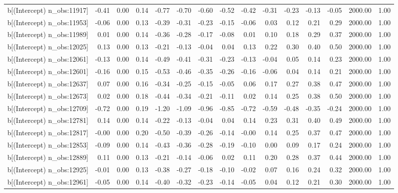 \begin{table}[ht]
\begin{tabular}{rrrrrrrrrrrrrrr}
  b[(Intercept) n\_obs:11917] & -0.41 & 0.00 & 0.14 & -0.77 & -0.70 & -0.60 & -0.52 & -0.42 & -0.31 & -0.23 & -0.13 & -0.05 & 2000.00 & 1.00 \\ 
  b[(Intercept) n\_obs:11953] & -0.06 & 0.00 & 0.13 & -0.39 & -0.31 & -0.23 & -0.15 & -0.06 & 0.03 & 0.12 & 0.21 & 0.29 & 2000.00 & 1.00 \\ 
  b[(Intercept) n\_obs:11989] & 0.01 & 0.00 & 0.14 & -0.36 & -0.28 & -0.17 & -0.08 & 0.01 & 0.10 & 0.18 & 0.29 & 0.37 & 2000.00 & 1.00 \\ 
  b[(Intercept) n\_obs:12025] & 0.13 & 0.00 & 0.13 & -0.21 & -0.13 & -0.04 & 0.04 & 0.13 & 0.22 & 0.30 & 0.40 & 0.50 & 2000.00 & 1.00 \\ 
  b[(Intercept) n\_obs:12061] & -0.13 & 0.00 & 0.14 & -0.49 & -0.41 & -0.31 & -0.23 & -0.13 & -0.04 & 0.05 & 0.14 & 0.23 & 2000.00 & 1.00 \\ 
  b[(Intercept) n\_obs:12601] & -0.16 & 0.00 & 0.15 & -0.53 & -0.46 & -0.35 & -0.26 & -0.16 & -0.06 & 0.04 & 0.14 & 0.21 & 2000.00 & 1.00 \\ 
  b[(Intercept) n\_obs:12637] & 0.07 & 0.00 & 0.16 & -0.34 & -0.25 & -0.15 & -0.05 & 0.06 & 0.17 & 0.27 & 0.38 & 0.47 & 2000.00 & 1.00 \\ 
  b[(Intercept) n\_obs:12673] & 0.02 & 0.00 & 0.18 & -0.44 & -0.34 & -0.21 & -0.11 & 0.02 & 0.14 & 0.25 & 0.38 & 0.50 & 2000.00 & 1.00 \\ 
  b[(Intercept) n\_obs:12709] & -0.72 & 0.00 & 0.19 & -1.20 & -1.09 & -0.96 & -0.85 & -0.72 & -0.59 & -0.48 & -0.35 & -0.24 & 2000.00 & 1.00 \\ 
  b[(Intercept) n\_obs:12781] & 0.14 & 0.00 & 0.14 & -0.22 & -0.13 & -0.04 & 0.04 & 0.14 & 0.23 & 0.31 & 0.40 & 0.49 & 2000.00 & 1.00 \\ 
  b[(Intercept) n\_obs:12817] & -0.00 & 0.00 & 0.20 & -0.50 & -0.39 & -0.26 & -0.14 & -0.00 & 0.14 & 0.25 & 0.37 & 0.47 & 2000.00 & 1.00 \\ 
  b[(Intercept) n\_obs:12853] & -0.09 & 0.00 & 0.14 & -0.43 & -0.36 & -0.28 & -0.19 & -0.10 & 0.00 & 0.09 & 0.17 & 0.24 & 2000.00 & 1.00 \\ 
  b[(Intercept) n\_obs:12889] & 0.11 & 0.00 & 0.13 & -0.21 & -0.14 & -0.06 & 0.02 & 0.11 & 0.20 & 0.28 & 0.37 & 0.44 & 2000.00 & 1.00 \\ 
  b[(Intercept) n\_obs:12925] & -0.01 & 0.00 & 0.13 & -0.38 & -0.27 & -0.18 & -0.10 & -0.02 & 0.07 & 0.16 & 0.24 & 0.32 & 2000.00 & 1.00 \\ 
  b[(Intercept) n\_obs:12961] & -0.05 & 0.00 & 0.14 & -0.40 & -0.32 & -0.23 & -0.14 & -0.05 & 0.04 & 0.12 & 0.21 & 0.30 & 2000.00 & 1.00 \\ 

\end{tabular}
\end{table}

